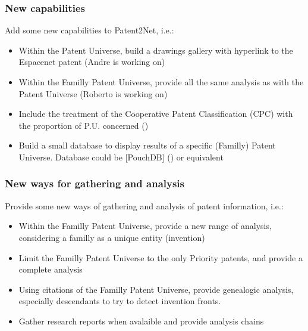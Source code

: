 \documentclass[letterpaper,10pt,english]{sphinxmanual}
\begin{document}
\subsubsection{New capabilities}
\label{\detokenize{todo:new-capabilities}}
Add some new capabilities to Patent2Net, i.e.:
\begin{itemize}
\item {} 
Within the Patent Universe, build a drawings gallery with hyperlink to the Espacenet patent (Andre is working on)

\item {} 
Within the Familly Patent Universe, provide all the same analysis as with the Patent Universe (Roberto is working on)

\item {} 
Include the treatment of the Cooperative Patent Classification (CPC) with the proportion of P.U. concerned ()

\item {} 
Build a small database to display results of a specific (Familly) Patent Universe. Database could be {[}PouchDB{]} () or equivalent

\end{itemize}


\subsubsection{New ways for gathering and analysis}
\label{\detokenize{todo:new-ways-for-gathering-and-analysis}}
Provide some new ways of gathering and analysis of patent information, i.e.:
\begin{itemize}
\item {} 
Within the Familly Patent Universe, provide a new range of analysis, considering a familly as a unique entity (invention)

\item {} 
Limit the Familly Patent Universe to the only Priority patents, and provide a complete analysis

\item {} 
Using citations of the Familly Patent Universe, provide genealogic analysis, especially descendants to try to detect invention fronts.

\item {} 
Gather research reports when avalaible and provide analysis chains

\end{itemize}
\end{document}
